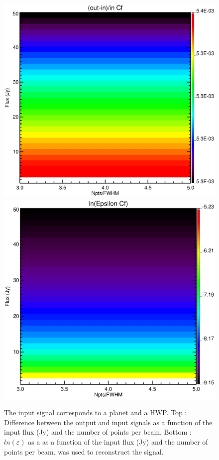 \begin{figure}[h]
\center
	\includegraphics[scale=0.2]{Figures/diff_cf_planet_hwp.eps}
	\includegraphics[scale=0.2]{Figures/epsilon_cf_planet_hwp.eps}
	\caption{The input signal corresponds to a planet and a HWP. Top : Difference between the output and input signals as a function of the input flux (Jy) and the number of points per beam. Bottom : $ln(\varepsilon)$ as a as a function of the input flux (Jy) and the number of points per beam. \cf was used to reconstruct the signal.}
	\label{fig:epsilon-cf-planet-hwp}
\end{figure}

